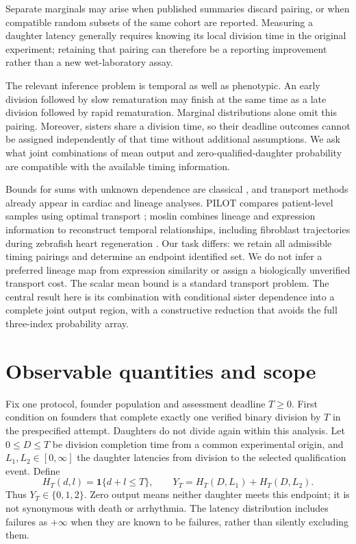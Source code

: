 \documentclass[11pt]{article}
\begin{document}
Separate marginals may arise when published summaries discard pairing, or when compatible random subsets of the same cohort are reported. Measuring a daughter latency generally requires knowing its local division time in the original experiment; retaining that pairing can therefore be a reporting improvement rather than a new wet-laboratory assay.

The relevant inference problem is temporal as well as phenotypic. An early division followed by slow rematuration may finish at the same time as a late division followed by rapid rematuration. Marginal distributions alone omit this pairing. Moreover, sisters share a division time, so their deadline outcomes cannot be assigned independently of that time without additional assumptions. We ask what joint combinations of mean output and zero-qualified-daughter probability are compatible with the available timing information.

Bounds for sums with unknown dependence are classical \cite{makarov}, and transport methods already appear in cardiac and lineage analyses. PILOT compares patient-level samples using optimal transport \cite{pilot}; moslin combines lineage and expression information to reconstruct temporal relationships, including fibroblast trajectories during zebrafish heart regeneration \cite{moslin}. Our task differs: we retain all admissible timing pairings and determine an endpoint identified set. We do not infer a preferred lineage map from expression similarity or assign a biologically unverified transport cost. The scalar mean bound is a standard transport problem. The central result here is its combination with conditional sister dependence into a complete joint output region, with a constructive reduction that avoids the full three-index probability array.

\section{Observable quantities and scope}
Fix one protocol, founder population and assessment deadline $T\geq0$. First condition on founders that complete exactly one verified binary division by $T$ in the prespecified attempt. Daughters do not divide again within this analysis. Let $0\leq D\leq T$ be division completion time from a common experimental origin, and $L_1,L_2\in[0,\infty]$ the daughter latencies from division to the selected qualification event. Define
\begin{equation}
 H_T(d,l)=\mathbf1\{d+l\leq T\},\qquad
 Y_T=H_T(D,L_1)+H_T(D,L_2).
 \label{eq:observable}
\end{equation}
Thus $Y_T\in\{0,1,2\}$. Zero output means neither daughter meets this endpoint; it is not synonymous with death or arrhythmia. The latency distribution includes failures as $+\infty$ when they are known to be failures, rather than silently excluding them.
\end{document}
